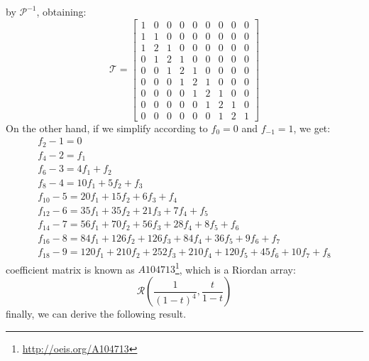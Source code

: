 \documentclass[a4paper,dottedtoc,headinclude,footinclude]{report} %
\theoremstyle{plain}
\begin{document}
        by $\mathcal{P}^{-1}$, obtaining:
    \begin{displaymath}
        \mathcal{T} = \left[\begin{array}{ccccccccc}
            1 & 0 & 0 & 0 & 0 & 0 & 0 & 0 & 0\\
            1 & 1 & 0 & 0 & 0 & 0 & 0 & 0 & 0\\
            1 & 2 & 1 & 0 & 0 & 0 & 0 & 0 & 0\\
            0 & 1 & 2 & 1 & 0 & 0 & 0 & 0 & 0\\
            0 & 0 & 1 & 2 & 1 & 0 & 0 & 0 & 0\\
            0 & 0 & 0 & 1 & 2 & 1 & 0 & 0 & 0\\
            0 & 0 & 0 & 0 & 1 & 2 & 1 & 0 & 0\\
            0 & 0 & 0 & 0 & 0 & 1 & 2 & 1 & 0\\
            0 & 0 & 0 & 0 & 0 & 0 & 1 & 2 & 1
            \end{array}\right]
    \end{displaymath}
    On the other hand, if we simplify according to $f_{0}=0$ and
    $f_{-1}=1$, we get:
    \begin{displaymath}
        \begin{array}{c}
            f_{2} - 1=0\\
            f_{4} - 2=f_{1}\\
            f_{6} - 3=4f_{1} + f_{2}\\
            f_{8} - 4=10f_{1} + 5 f_{2} + f_{3}\\
            f_{10} - 5=20f_{1} + 15 f_{2} + 6 f_{3} + f_{4}\\
            f_{12} - 6=35f_{1} + 35 f_{2} + 21 f_{3} + 7 f_{4} + f_{5}\\
            f_{14} - 7=56f_{1} + 70 f_{2} + 56 f_{3} + 28 f_{4} + 8 f_{5} + f_{6}\\
            f_{16} - 8=84f_{1} + 126 f_{2} + 126 f_{3} + 84 f_{4} + 36 f_{5} + 9 f_{6} + f_{7}\\
            f_{18} - 9 = 120 f_{1} + 210 f_{2} + 252 f_{3} + 210 f_{4} + 120 f_{5} + 45 f_{6} + 10 f_{7} + f_{8}
            \end{array}
    \end{displaymath}
    coefficient matrix is known as $A104713$\footnote{\url{http://oeis.org/A104713}},
    which is a Riordan array:
    \begin{displaymath}
        \mathcal{R}\left(\frac{1}{(1-t)^4}, \frac{t}{1-t}\right)
    \end{displaymath}
    finally, we can derive the following result.
\end{document}
